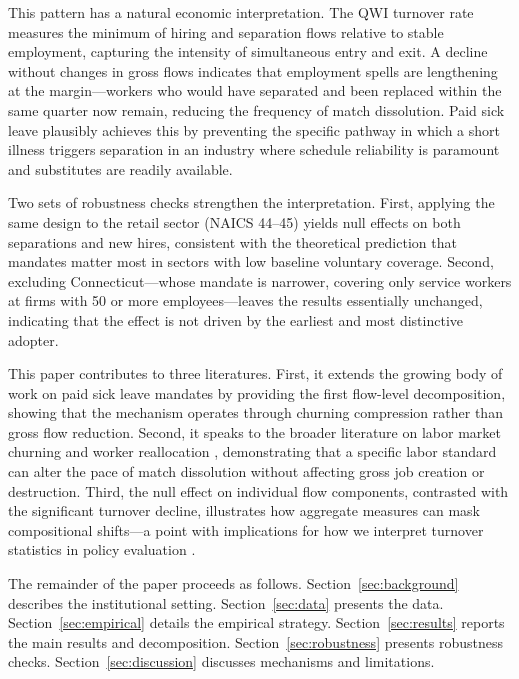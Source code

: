\documentclass[12pt]{article}
\begin{document}
This pattern has a natural economic interpretation. The QWI turnover rate measures the minimum of hiring and separation flows relative to stable employment, capturing the intensity of simultaneous entry and exit. A decline without changes in gross flows indicates that employment spells are lengthening at the margin---workers who would have separated and been replaced within the same quarter now remain, reducing the frequency of match dissolution. Paid sick leave plausibly achieves this by preventing the specific pathway in which a short illness triggers separation in an industry where schedule reliability is paramount and substitutes are readily available.

Two sets of robustness checks strengthen the interpretation. First, applying the same design to the retail sector (NAICS 44--45) yields null effects on both separations and new hires, consistent with the theoretical prediction that mandates matter most in sectors with low baseline voluntary coverage. Second, excluding Connecticut---whose mandate is narrower, covering only service workers at firms with 50 or more employees---leaves the results essentially unchanged, indicating that the effect is not driven by the earliest and most distinctive adopter.

This paper contributes to three literatures. First, it extends the growing body of work on paid sick leave mandates \citep{Pichler2020, Callison2021, Stearns2023, Maclean2020, Ahn2024} by providing the first flow-level decomposition, showing that the mechanism operates through churning compression rather than gross flow reduction. Second, it speaks to the broader literature on labor market churning and worker reallocation \citep{Lazear2016, DavisHS2012, Hyatt2013}, demonstrating that a specific labor standard can alter the pace of match dissolution without affecting gross job creation or destruction. Third, the null effect on individual flow components, contrasted with the significant turnover decline, illustrates how aggregate measures can mask compositional shifts---a point with implications for how we interpret turnover statistics in policy evaluation \citep{Burgess2000}.

The remainder of the paper proceeds as follows. Section~\ref{sec:background} describes the institutional setting. Section~\ref{sec:data} presents the data. Section~\ref{sec:empirical} details the empirical strategy. Section~\ref{sec:results} reports the main results and decomposition. Section~\ref{sec:robustness} presents robustness checks. Section~\ref{sec:discussion} discusses mechanisms and limitations.
\end{document}

